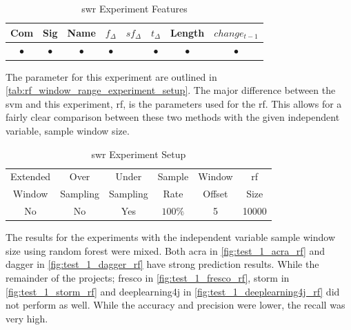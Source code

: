 \begin{table}[h]
\begin{center}

    \begin{tabular}{|c|c|c|c|c|c|c|c|}
        \hline
        Com & Sig & Name & $f_{\Delta}$ & $sf_{\Delta}$ & $t_\Delta$ & Length & $change_{t-1}$ \\
         \hline
        $\bullet$ & $\bullet$ & $\bullet$ & $\bullet$ & & $\bullet$ & $\bullet$ & $\bullet$ \\ \hline
    \end{tabular}
    \caption{\gls{swr} Experiment Features}
    \label{tab:rf_window_range_experiment_features}
\end{center}

\end{table}


The parameter for this experiment are outlined in \autoref{tab:rf_window_range_experiment_setup}. The major difference between the \gls{svm} and this experiment, \gls{rf}, is the parameters used for the \gls{rf}. This allows for a fairly clear comparison between these two methods with the given independent variable, sample window size.

\begin{table}[h]
\begin{center}

    \begin{tabular}{|c|c|c|c|c|c|}
        \hline
        Extended & Over & Under & Sample & Window & \gls{rf} \\
        Window & Sampling & Sampling & Rate & Offset & Size \\ \hline
        No & No & Yes & $100\%$ & 5 & 10000 \\ \hline
    \end{tabular}
    \caption{\gls{swr} Experiment Setup}
    \label{tab:rf_window_range_experiment_setup}
\end{center}

\end{table}

The results for the experiments with the independent variable sample window size using random forest were mixed. Both acra in \autoref{fig:test_1_acra_rf} and dagger in \autoref{fig:test_1_dagger_rf} have strong prediction results. While the remainder of the projects; fresco in \autoref{fig:test_1_fresco_rf}, storm in \autoref{fig:test_1_storm_rf} and deeplearning4j in \autoref{fig:test_1_deeplearning4j_rf} did not perform as well. While the accuracy and precision were lower, the recall was very high.

